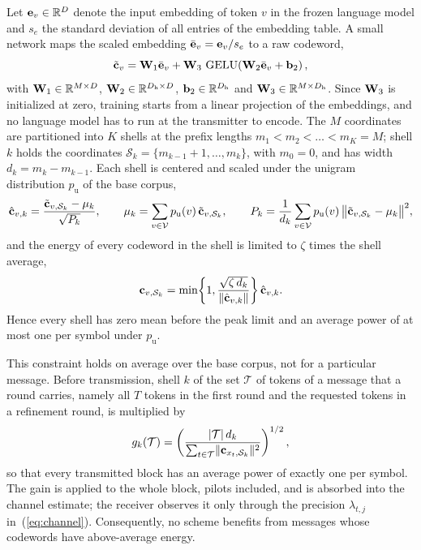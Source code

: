 Let $\mathbf{e}_v\in\mathbb{R}^{D}$ denote the input embedding of token $v$ in the frozen language model and $s_e$ the standard deviation of all entries of the embedding table. A small network maps the scaled embedding $\bar{\mathbf{e}}_v = \mathbf{e}_v/s_e$ to a raw codeword,
\begin{equation}
\tilde{\mathbf{c}}_v = \mathbf{W}_1\bar{\mathbf{e}}_v + \mathbf{W}_3\,\operatorname{GELU}\!\left(\mathbf{W}_2\bar{\mathbf{e}}_v + \mathbf{b}_2\right),
\label{eq:codeword}
\end{equation}
with $\mathbf{W}_1\in\mathbb{R}^{M\times D}$, $\mathbf{W}_2\in\mathbb{R}^{D_\mathrm{h}\times D}$, $\mathbf{b}_2\in\mathbb{R}^{D_\mathrm{h}}$ and $\mathbf{W}_3\in\mathbb{R}^{M\times D_\mathrm{h}}$. Since $\mathbf{W}_3$ is initialized at zero, training starts from a linear projection of the embeddings, and no language model has to run at the transmitter to encode. The $M$ coordinates are partitioned into $K$ shells at the prefix lengths $m_1<m_2<\dots<m_K = M$; shell $k$ holds the coordinates $\mathcal{S}_k = \{m_{k-1}+1,\dots,m_k\}$, with $m_0 = 0$, and has width $d_k = m_k-m_{k-1}$. Each shell is centered and scaled under the unigram distribution $p_\mathrm{u}$ of the base corpus,
\begin{equation}
\hat{\mathbf{c}}_{v,k} = \frac{\tilde{\mathbf{c}}_{v,\mathcal{S}_k}-\mathbf{\mu}_k}{\sqrt{P_k}},\qquad
\mathbf{\mu}_k = \sum_{v\in\mathcal{V}} p_\mathrm{u}(v)\,\tilde{\mathbf{c}}_{v,\mathcal{S}_k},\qquad
P_k = \frac{1}{d_k}\sum_{v\in\mathcal{V}} p_\mathrm{u}(v)\,\bigl\lVert\tilde{\mathbf{c}}_{v,\mathcal{S}_k}-\mathbf{\mu}_k\bigr\rVert^2,
\label{eq:shell}
\end{equation}
and the energy of every codeword in the shell is limited to $\zeta$ times the shell average,
\begin{equation}
\mathbf{c}_{v,\mathcal{S}_k} = \min\!\left\{1,\frac{\sqrt{\zeta\,d_k}}{\lVert\hat{\mathbf{c}}_{v,k}\rVert}\right\}\hat{\mathbf{c}}_{v,k}.
\label{eq:peak}
\end{equation}
Hence every shell has zero mean before the peak limit and an average power of at most one per symbol under $p_\mathrm{u}$.

This constraint holds on average over the base corpus, not for a particular message. Before transmission, shell $k$ of the set $\mathcal{T}$ of tokens of a message that a round carries, namely all $T$ tokens in the first round and the requested tokens in a refinement round, is multiplied by
\begin{equation}
g_k(\mathcal{T}) = \left(\frac{|\mathcal{T}|\,d_k}{\sum_{t\in\mathcal{T}}\lVert\mathbf{c}_{x_t,\mathcal{S}_k}\rVert^2}\right)^{1/2},
\label{eq:gain}
\end{equation}
so that every transmitted block has an average power of exactly one per symbol. The gain is applied to the whole block, pilots included, and is absorbed into the channel estimate; the receiver observes it only through the precision $\lambda_{t,j}$ in~(\ref{eq:channel}). Consequently, no scheme benefits from messages whose codewords have above-average energy.

